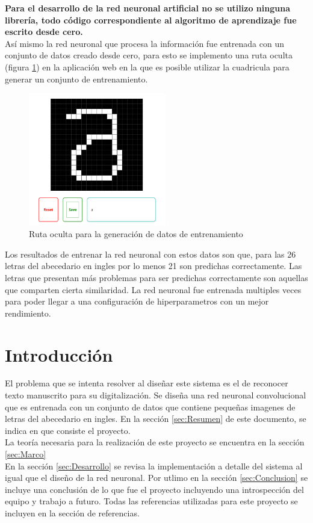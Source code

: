 \documentclass{article}
\begin{document}
\textbf{Para el desarrollo de la red neuronal artificial no se utilizo ninguna librería, todo código correspondiente al algoritmo de aprendizaje fue escrito desde cero.} \\
Así mismo la red neuronal que procesa la información fue entrenada con un conjunto de datos creado desde cero, para esto se implemento una ruta oculta (figura \ref{trainer}) en la aplicación web en la que es posible utilizar la cuadricula para generar 
un conjunto de entrenamiento.
\begin{figure}[H]
    \centering
    \includegraphics[width=60mm]{trainer.png}
    \caption{Ruta oculta para la generación de datos de entrenamiento}
    \label{trainer}
\end{figure}
Los resultados de entrenar la red neuronal con estos datos son que, para las 26 letras del abecedario en ingles por lo menos 21 son predichas correctamente. Las letras que presentan más problemas para ser predichas correctamente son aquellas que 
comparten cierta similaridad. La red neuronal fue entrenada multiples veces para poder llegar a una configuración de hiperparametros con un mejor rendimiento. 

\section{Introducción}\label{sec:Introduccion}
El problema que se intenta resolver al diseñar este sistema es el de reconocer texto manuscrito para su digitalización. 
Se diseña una red neuronal convolucional que es entrenada con un conjunto de datos que contiene pequeñas imagenes de letras del abecedario en ingles. 
En la sección \ref{sec:Resumen} de este documento, se indica en que consiste el proyecto.  \\
La teoría necesaria para la realización de este proyecto se encuentra en la sección \ref{sec:Marco} \\
En la sección \ref{sec:Desarrollo} se revisa la implementación a detalle del sistema al igual que el diseño de la red neuronal. 
Por utlimo en la sección \ref{sec:Conclusion} se incluye una conclusión de lo que fue el proyecto incluyendo una introspección del equipo y trabajo a futuro. 
Todas las referencias utilizadas para este proyecto se incluyen en la sección de referencias.
\end{document}
